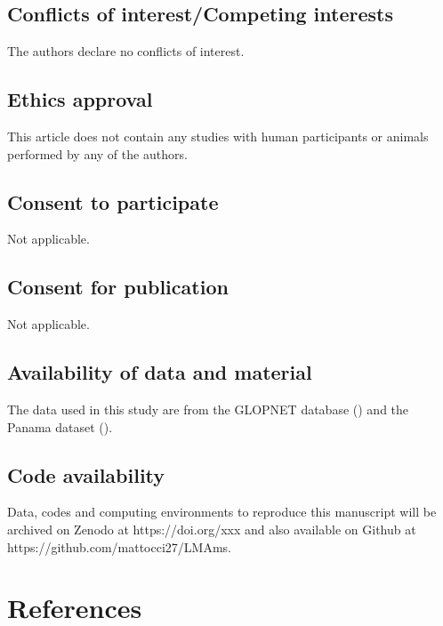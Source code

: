\documentclass[
  12pt,
  letterpaper,
  DIV=11,
  numbers=noendperiod]{scrartcl}
\begin{document}
\subsection{Conflicts of interest/Competing
interests}\label{conflicts-of-interestcompeting-interests}

The authors declare no conflicts of interest.

\subsection{Ethics approval}\label{ethics-approval}

This article does not contain any studies with human participants or
animals performed by any of the authors.

\subsection{Consent to participate}\label{consent-to-participate}

Not applicable.

\subsection{Consent for publication}\label{consent-for-publication}

Not applicable.

\subsection{Availability of data and
material}\label{availability-of-data-and-material}

The data used in this study are from the GLOPNET database
() and the Panama dataset
().

\subsection{Code availability}\label{code-availability}

Data, codes and computing environments to reproduce this manuscript will
be archived on Zenodo at https://doi.org/xxx and also available on
Github at https://github.com/mattocci27/LMAms.

\section{References}\label{references}
\end{document}
